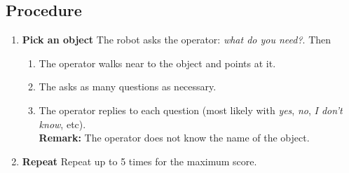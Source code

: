 \subsection*{Procedure}
\begin{enumerate}[nosep]
	\item \textbf{Pick an object} The robot asks the operator: \emph{what do you need?}. %
	Then
	\begin{enumerate}[nosep]
		\item The operator walks near to the object and points at it.
		\item The asks as many questions as necessary.
		\item The operator replies to each question (most likely with \emph{yes}, \emph{no}, \emph{I don't know}, etc).
		\\\textbf{Remark:} The operator does not know the name of the object.
	\end{enumerate}
  \item \textbf{Repeat} Repeat up to 5 times for the maximum score.
\end{enumerate}


%
%
